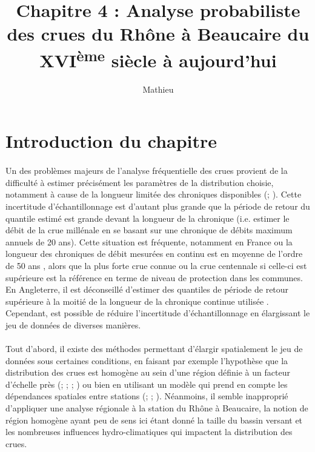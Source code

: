 \documentclass[11pt]{article}
\title{Chapitre 4 : Analyse probabiliste des crues du Rhône à Beaucaire du XVI\textsuperscript{ème} siècle à aujourd'hui}
\author{Mathieu}
\begin{document}
\maketitle

\tableofcontents

\section{Introduction du chapitre}

	\paragraph{} Un des problèmes majeurs de l'analyse fréquentielle des crues provient de la difficulté à estimer précisément les paramètres de la distribution choisie, notamment à cause de la longueur limitée des chroniques disponibles (\citet{kjeldsen_uncertainty_2011}; \citet{apel_flood_2004}). Cette incertitude d'échantillonnage est d'autant plus grande que la période de retour du quantile estimé est grande devant la longueur de la chronique (i.e. estimer le débit de la crue millénale en se basant sur une chronique de débits maximum annuels de 20 ans). Cette situation est fréquente, notamment en France ou la longueur des chroniques de débit mesurées en continu est en moyenne de l'ordre de 50 ans \citep{le_coz_quantifying_2017}, alors que la plus forte crue connue ou la crue centennale si celle-ci est supérieure est la référence en terme de niveau de protection dans les communes. En Angleterre, il est déconseillé d'estimer des quantiles de période de retour supérieure à la moitié de la longueur de la chronique continue utilisée \citep{whs_flood_2008}. Cependant, est possible de réduire l'incertitude d'échantillonnage en élargissant le jeu de données de diverses manières.
	 
	\paragraph{}Tout d'abord, il existe des méthodes permettant d'élargir spatialement le jeu de données sous certaines conditions, en faisant par exemple l'hypothèse que la distribution des crues est homogène au sein d'une région définie à un facteur d'échelle près (\citet{hosking_regional_1997}; \citet{gaume_bayesian_2010}; \citet{viglione_flood_2013}; \citet{nguyen_regional_2014}) ou bien en utilisant un modèle qui prend en compte les dépendances spatiales entre stations (\citet{kjeldsen_exploratory_2009}; \citet{renard_bayesian_2011}; \citet{sun_general_2014}). Néanmoins, il semble inapproprié d'appliquer une analyse régionale à la station du Rhône à Beaucaire, la notion de région homogène ayant peu de sens ici étant donné la taille du bassin versant et les nombreuses influences hydro-climatiques qui impactent la distribution des crues.
	
\end{document}
